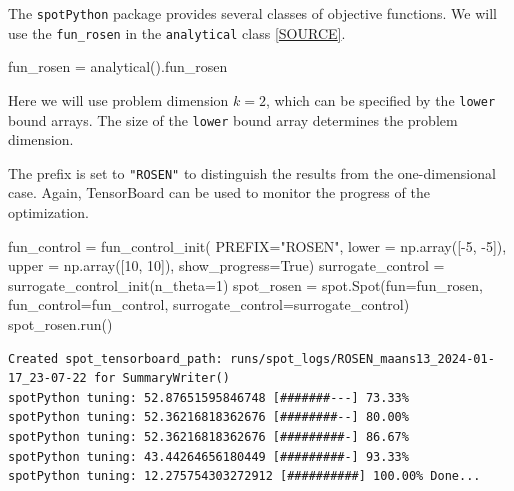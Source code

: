 \documentclass[
  letterpaper,
  DIV=11,
  numbers=noendperiod]{scrreprt}
\newenvironment{Shaded}{\begin{snugshade}}{\end{snugshade}}
\newcommand{\DecValTok}[1]{\textcolor[rgb]{0.68,0.00,0.00}{#1}}
\newcommand{\NormalTok}[1]{\textcolor[rgb]{0.00,0.23,0.31}{#1}}
\newcommand{\OperatorTok}[1]{\textcolor[rgb]{0.37,0.37,0.37}{#1}}
\newcommand{\StringTok}[1]{\textcolor[rgb]{0.13,0.47,0.30}{#1}}
\newcommand{\VariableTok}[1]{\textcolor[rgb]{0.07,0.07,0.07}{#1}}
\begin{document}
The \texttt{spotPython} package provides several classes of objective
functions. We will use the \texttt{fun\_rosen} in the
\texttt{analytical} class
\href{https://github.com/sequential-parameter-optimization/spotPython/blob/main/src/spotPython/fun/objectivefunctions.py}{{[}SOURCE{]}}.

\begin{Shaded}
\begin{Highlighting}[]
\NormalTok{fun\_rosen }\OperatorTok{=}\NormalTok{ analytical().fun\_rosen}
\end{Highlighting}
\end{Shaded}

Here we will use problem dimension \(k=2\), which can be specified by
the \texttt{lower} bound arrays. The size of the \texttt{lower} bound
array determines the problem dimension.

The prefix is set to \texttt{"ROSEN"} to distinguish the results from
the one-dimensional case. Again, TensorBoard can be used to monitor the
progress of the optimization.

\begin{Shaded}
\begin{Highlighting}[]
\NormalTok{fun\_control }\OperatorTok{=}\NormalTok{ fun\_control\_init(}
\NormalTok{              PREFIX}\OperatorTok{=}\StringTok{"ROSEN"}\NormalTok{,}
\NormalTok{              lower }\OperatorTok{=}\NormalTok{ np.array([}\OperatorTok{{-}}\DecValTok{5}\NormalTok{, }\OperatorTok{{-}}\DecValTok{5}\NormalTok{]),}
\NormalTok{              upper }\OperatorTok{=}\NormalTok{ np.array([}\DecValTok{10}\NormalTok{, }\DecValTok{10}\NormalTok{]),}
\NormalTok{              show\_progress}\OperatorTok{=}\VariableTok{True}\NormalTok{)}
\NormalTok{surrogate\_control }\OperatorTok{=}\NormalTok{ surrogate\_control\_init(n\_theta}\OperatorTok{=}\DecValTok{1}\NormalTok{)}
\NormalTok{spot\_rosen }\OperatorTok{=}\NormalTok{ spot.Spot(fun}\OperatorTok{=}\NormalTok{fun\_rosen,}
\NormalTok{                  fun\_control}\OperatorTok{=}\NormalTok{fun\_control,}
\NormalTok{                  surrogate\_control}\OperatorTok{=}\NormalTok{surrogate\_control)}
\NormalTok{spot\_rosen.run()}
\end{Highlighting}
\end{Shaded}

\begin{verbatim}
Created spot_tensorboard_path: runs/spot_logs/ROSEN_maans13_2024-01-17_23-07-22 for SummaryWriter()
spotPython tuning: 52.87651595846748 [#######---] 73.33% 
spotPython tuning: 52.36216818362676 [########--] 80.00% 
spotPython tuning: 52.36216818362676 [#########-] 86.67% 
spotPython tuning: 43.44264656180449 [#########-] 93.33% 
spotPython tuning: 12.275754303272912 [##########] 100.00% Done...
\end{verbatim}
\end{document}
